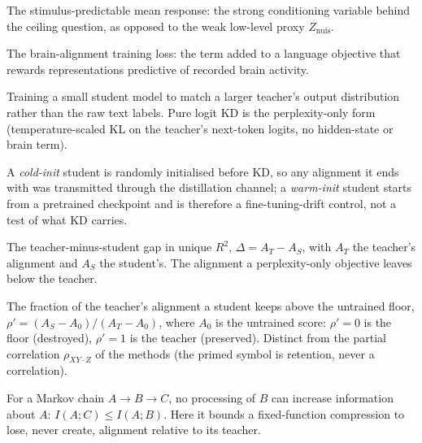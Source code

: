 \begin{description}[leftmargin=2em,style=nextline]
  \item[\Eys{}] The stimulus-predictable mean response: the strong conditioning variable behind the ceiling question, as opposed to the weak low-level proxy $Z_{\mathrm{nuis}}$.
  \item[\Lbrain{}] The brain-alignment training loss: the term added to a language objective that rewards representations predictive of recorded brain activity.
  \item[Knowledge distillation (KD)] Training a small student model to match a larger teacher's output distribution rather than the raw text labels. Pure logit KD is the perplexity-only form (temperature-scaled KL on the teacher's next-token logits, no hidden-state or brain term).
  \item[Cold-init / warm-init KD] A \emph{cold-init} student is randomly initialised before KD, so any alignment it ends with was transmitted through the distillation channel; a \emph{warm-init} student starts from a pretrained checkpoint and is therefore a fine-tuning-drift control, not a test of what KD carries.
  \item[Headroom ($\Delta$)] The teacher-minus-student gap in unique $R^2$, $\Delta = A_T - A_S$, with $A_T$ the teacher's alignment and $A_S$ the student's. The alignment a perplexity-only objective leaves below the teacher.
  \item[Floor-anchored retention ($\rho'$)] The fraction of the teacher's alignment a student keeps above the untrained floor, $\rho' = (A_S - A_0)/(A_T - A_0)$, where $A_0$ is the untrained score: $\rho'=0$ is the floor (destroyed), $\rho'=1$ is the teacher (preserved). Distinct from the partial correlation $\rho_{XY\cdot Z}$ of the methods (the primed symbol is retention, never a correlation).
  \item[Data-processing inequality (DPI)] For a Markov chain $A\to B\to C$, no processing of $B$ can increase information about $A$: $I(A;C)\le I(A;B)$. Here it bounds a fixed-function compression to lose, never create, alignment relative to its teacher.
\end{description}
